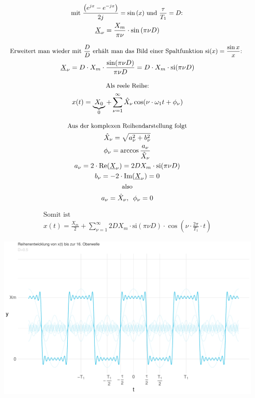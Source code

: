 \documentclass[a4paper, 12pt]{article}
\begin{document}
  \begin{gather*}
    \text{\small{ mit $ \frac{\left ( e^{jx} - e^{-jx} \right )}{2 j} = \sin{(x)}$ und $\frac{\tau}{T_1} = D$: }}\notag\\
    \underline{X}_\nu = \frac{X_m}{\pi \nu } \cdot \sin{(\pi \nu D)}
  \end{gather*}

  \begin{gather*}
      \text{\small Erweitert man wieder mit $\frac{D}{D}$ erhält man das Bild einer Spaltfunktion $\text{si}(x)=\frac{\sin x }{x}$: }\notag\\
      \underline{X}_\nu = D \cdot X_m \cdot \frac{\sin(\pi \nu D)}{\pi \nu D} = D \cdot X_m \cdot \text{si}(\pi \nu D)
  \end{gather*}

  \begin{gather*}
      \text{\small Als reele Reihe:}\notag\\
      x(t) = \underbrace{X_0}_0 + \sum^{\infty}_{\nu=1}{\hat{X}_\nu \cos(\nu \cdot \omega_1 t + \phi_\nu )}
  \end{gather*}

  \begin{gather*}
    \text{\small Aus der komplexen Reihendarstellung folgt}\notag\\
    \hat{X}_\nu = \sqrt{a^2_\nu + b^2_\nu}\\
    \phi_\nu = \arccos{\frac{a_\nu}{\hat{X}_\nu}}\\
    a_\nu = 2 \cdot \text{Re}(\underline{X}_\nu) = 2 D X_m \cdot \text{si}(\pi \nu D)\\
    b_\nu = -2 \cdot \text{Im}(\underline{X}_\nu) = 0\\
    \text{\small also}\notag\\
    a_\nu = \hat{X}_\nu, \,\
    \phi_\nu = 0
  \end{gather*}

  \begin{gather*}
    \text{Somit ist}\\
    x(t) = \frac{X_m}{2} + \sum^{\infty}_{\nu=1}{2 D X_m \cdot \text{si}(\pi \nu D) \cdot \cos(\nu \cdot \frac{2\pi}{T_1} \cdot t)}
  \end{gather*}

  \begin{center}
    \includegraphics[scale=0.5]{./R/2_1/2_1_Reihe.pdf}
  \end{center}
\end{document}
